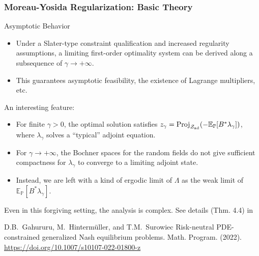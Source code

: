 \documentclass[aspectratio=169,xcolor=dvipsnames,11pt]{beamer}
\newcommand{\setZ}{\mathcal{Z}}
\begin{document}
\begin{footnotesize}
\begin{frame}\frametitle{Moreau-Yosida Regularization: Basic Theory}
\begin{block}{Asymptotic Behavior}
\begin{itemize}
\item Under a Slater-type constraint qualification and increased regularity assumptions, a limiting first-order optimality system can be derived along a subsequence of $\gamma \to +\infty$.
\item This guarantees asymptotic feasibility, the existence of Lagrange multipliers, etc.
\end{itemize}\pause
An interesting feature: 
\begin{itemize}
\item For finite $\gamma > 0$, the optimal solution satisfies $z_{\gamma} = \mathrm{Proj}_{\setZ_{\rm ad}}(-\mathbb E_{\mathbb P}[B^* \lambda_{\gamma}])$, where $\lambda_{\gamma}$
solves a ``typical'' adjoint equation.
\item For $\gamma \to +\infty$, the Bochner spaces for the random fields do not give sufficient compactness for $\lambda_{\gamma}$ to converge to a limiting adjoint state.
\item Instead, we are left with a kind of ergodic limit of $\Lambda$ as the weak limit of $\mathbb E_{\mathbb P}[B^* \lambda_{\gamma}]$.
\end{itemize}\pause
Even in this forgiving setting, the analysis is complex. See details (Thm. 4.4) in 

\begin{thebibliography}{10}\tiny
{}
{\sc D.B.~Gahururu, M.~Hinterm\"uller, and T.M.~Surowiec}
\newblock Risk-neutral PDE-constrained generalized Nash equilibrium problems. 
\newblock Math. Program. (2022). \url{https://doi.org/10.1007/s10107-022-01800-z}
\end{thebibliography}
\end{block}
\end{frame}


\end{footnotesize}
\end{document}
